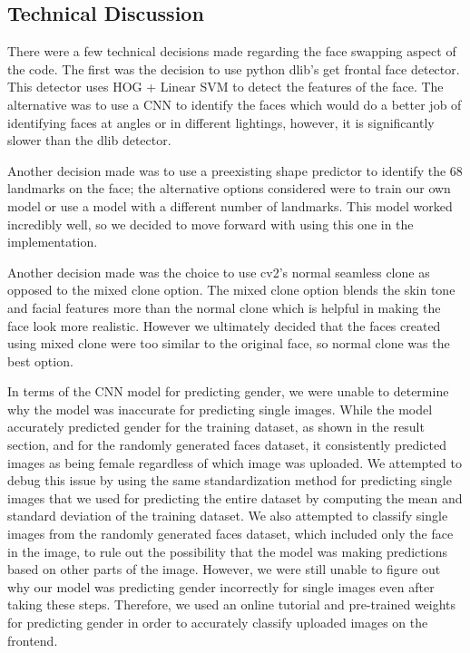 \subsection{Technical Discussion}


There were a few technical decisions made regarding the face swapping aspect of the code.
The first was the decision to use python dlib's get frontal face detector. This detector uses HOG + Linear SVM
to detect the features of the face. The alternative was to use a CNN to identify the faces which would do a better
job of identifying faces at angles or in different lightings, however, it is significantly slower than the dlib detector.

Another decision made was to use a preexisting shape predictor to identify the 68 landmarks on the face; the alternative options
considered were to train our own model or use a model with a different number of landmarks. This model worked incredibly well, so
we decided to move forward with using this one in the implementation.

Another decision made was the choice to use cv2's normal seamless clone as opposed to the mixed clone option. The mixed clone option
blends the skin tone and facial features more than the normal clone which is helpful in making the face look more realistic.
However we ultimately decided that the faces created using mixed clone were too similar to the original face, so normal
clone was the best option.

In terms of the CNN model for predicting gender, we were unable to determine why the model was inaccurate for predicting single images. While
the model accurately predicted gender for the training dataset, as shown in the result section, and for the randomly generated faces dataset,
it consistently predicted images as being female regardless of which image was uploaded. We attempted to debug this issue by using the same standardization
method for predicting single images that we used for predicting the entire dataset by computing the mean and standard deviation of the training dataset. We also
attempted to classify single images from the randomly generated faces dataset, which included only the face in the image, to rule out the possibility that the model
was making predictions based on other parts of the image. However, we were still unable to figure out why our model was predicting gender incorrectly for single images
even after taking these steps. Therefore, we used an online tutorial and pre-trained weights for predicting gender in order to accurately classify
uploaded images on the frontend.

